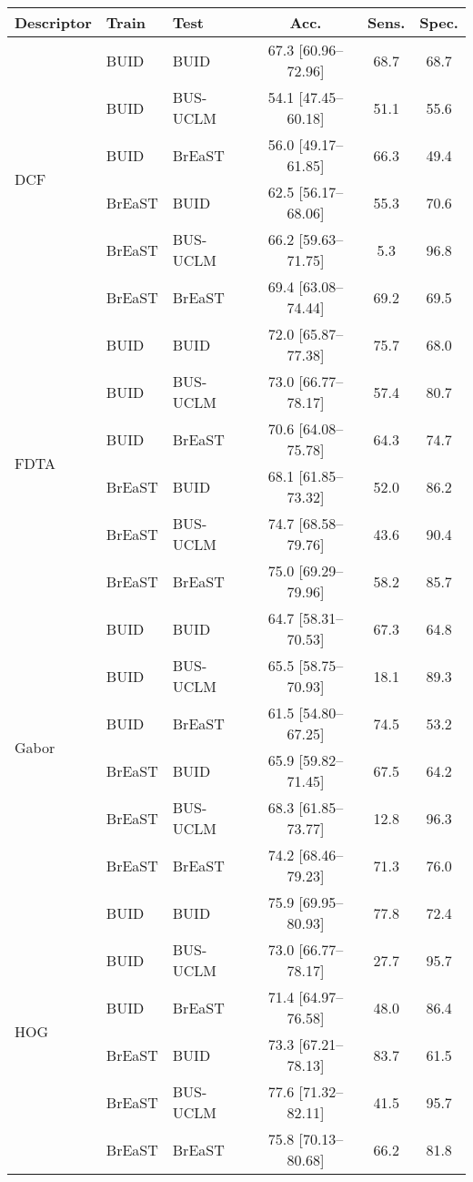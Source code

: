 \begin{tabular}{lllccc}\\ 
\toprule
Descriptor & Train &Test & Acc. & Sens. &Spec.\\ 
\midrule
\multirow{6}{*}{DCF} & BUID & BUID & 67.3 [60.96--72.96] & 68.7 & 68.7\\ 
 & BUID & BUS-UCLM & 54.1 [47.45--60.18] & 51.1 & 55.6\\ 
 & BUID & BrEaST & 56.0 [49.17--61.85] & 66.3 & 49.4\\ 
 & BrEaST & BUID & 62.5 [56.17--68.06] & 55.3 & 70.6\\ 
 & BrEaST & BUS-UCLM & 66.2 [59.63--71.75] & 5.3 & 96.8\\ 
 & BrEaST & BrEaST & 69.4 [63.08--74.44] & 69.2 & 69.5\\ 
\midrule
\multirow{6}{*}{FDTA} & BUID & BUID & 72.0 [65.87--77.38] & 75.7 & 68.0\\ 
 & BUID & BUS-UCLM & 73.0 [66.77--78.17] & 57.4 & 80.7\\ 
 & BUID & BrEaST & 70.6 [64.08--75.78] & 64.3 & 74.7\\ 
 & BrEaST & BUID & 68.1 [61.85--73.32] & 52.0 & 86.2\\ 
 & BrEaST & BUS-UCLM & 74.7 [68.58--79.76] & 43.6 & 90.4\\ 
 & BrEaST & BrEaST & 75.0 [69.29--79.96] & 58.2 & 85.7\\ 
\midrule
\multirow{6}{*}{Gabor} & BUID & BUID & 64.7 [58.31--70.53] & 67.3 & 64.8\\ 
 & BUID & BUS-UCLM & 65.5 [58.75--70.93] & 18.1 & 89.3\\ 
 & BUID & BrEaST & 61.5 [54.80--67.25] & 74.5 & 53.2\\ 
 & BrEaST & BUID & 65.9 [59.82--71.45] & 67.5 & 64.2\\ 
 & BrEaST & BUS-UCLM & 68.3 [61.85--73.77] & 12.8 & 96.3\\ 
 & BrEaST & BrEaST & 74.2 [68.46--79.23] & 71.3 & 76.0\\ 
\midrule
\multirow{6}{*}{HOG} & BUID & BUID & 75.9 [69.95--80.93] & 77.8 & 72.4\\ 
 & BUID & BUS-UCLM & 73.0 [66.77--78.17] & 27.7 & 95.7\\ 
 & BUID & BrEaST & 71.4 [64.97--76.58] & 48.0 & 86.4\\ 
 & BrEaST & BUID & 73.3 [67.21--78.13] & 83.7 & 61.5\\ 
 & BrEaST & BUS-UCLM & 77.6 [71.32--82.11] & 41.5 & 95.7\\ 
 & BrEaST & BrEaST & 75.8 [70.13--80.68] & 66.2 & 81.8\\ 

\end{tabular}
